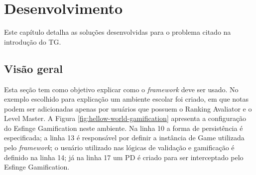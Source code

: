 \newpage
\chapter{Desenvolvimento}
\label{ch:desenvolvimento}




\par Este capítulo detalha as soluções desenvolvidas para o problema citado na introdução do TG.

\section{Visão geral}

\par Esta seção tem como objetivo explicar como o \textit{framework} deve ser usado. No exemplo escolhido para explicação um ambiente escolar foi criado, em que notas podem ser adicionadas apenas por usuários que possuem o Ranking Avaliator e o Level Master. A Figura \ref{fig:hellow-world-gamification} apresenta a configuração do Esfinge Gamification neste ambiente. Na linha 10 a forma de persistência é especificada; a linha 13 é responsável por definir a instância de Game utilizada pelo \textit{framework}; o usuário utilizado nas lógicas de validação e gamificação é definido na linha 14; já na linha 17 um PD é criado para ser interceptado pelo Esfinge Gamification.


